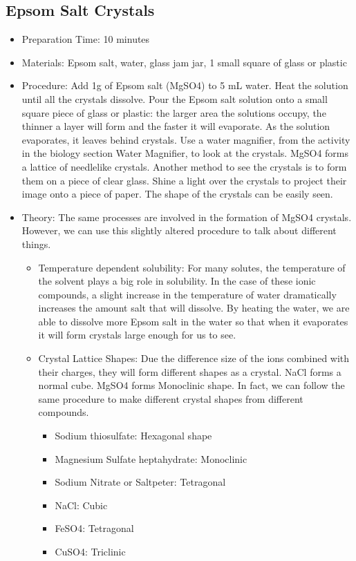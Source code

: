 \subsection{Epsom Salt Crystals}
\begin{itemize}
\item{Preparation Time: 10 minutes}
\item{Materials: Epsom salt, water, glass jam jar, 1 small square of glass or plastic}
\item{Procedure: Add 1g of Epsom salt (MgSO4) to 5 mL water. Heat the solution until all the crystals dissolve. Pour the Epsom salt solution onto a small square piece of glass or plastic: the larger area the solutions occupy, the thinner a layer will form and the faster it will evaporate. As the solution evaporates, it leaves behind crystals. Use a water magnifier, from the activity in the biology section Water Magnifier, to look at the crystals. MgSO4 forms a lattice of needlelike crystals. Another method to see the crystals is to form them on a piece of clear glass. Shine a light over the crystals to project their image onto a piece of paper. The shape of the crystals can be easily seen. }
\item{Theory: The same processes are involved in the formation of MgSO4 crystals. However, we can use this slightly altered procedure to talk about different things.
\begin{itemize}
\item{Temperature dependent solubility: For many solutes, the temperature of the solvent plays a big role in solubility. In the case of these ionic compounds, a slight increase in the temperature of water dramatically increases the amount salt that will dissolve. By heating the water, we are able to dissolve more Epsom salt in the water so that when it evaporates it will form crystals large enough for us to see.}
\item{Crystal Lattice Shapes: Due the difference size of the ions combined with their charges, they will form different shapes as a crystal. NaCl forms a normal cube. MgSO4 forms Monoclinic shape. In fact, we can follow the same procedure to make different crystal shapes from different compounds. 
\begin{itemize}
\item{Sodium thiosulfate: Hexagonal shape}
\item{Magnesium Sulfate heptahydrate: Monoclinic}
\item{Sodium Nitrate or Saltpeter: Tetragonal}
\item{NaCl: Cubic}
\item{FeSO4: Tetragonal}
\item{CuSO4: Triclinic}
\end{itemize}
} %
\end{itemize}
} %
\end{itemize}

